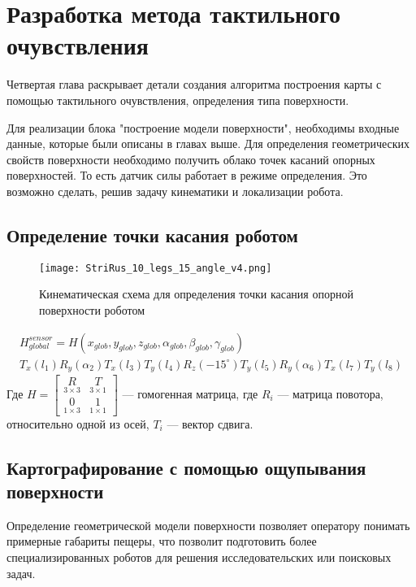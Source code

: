 \chapter{Разработка метода тактильного очувствления}\label{ch:ch4}


Четвертая глава раскрывает детали создания алгоритма построения карты с помощью тактильного очувствления, определения типа поверхности.

Для реализации блока "построение модели поверхности", необходимы входные данные, которые были  описаны в главах выше. Для определения геометрических свойств поверхности необходимо получить облако точек касаний опорных поверхностей. То есть датчик силы работает в режиме определения. Это возможно сделать, решив задачу кинематики и локализации робота.

\section{Определение точки касания роботом}
\begin{figure}[H]
    \centering\texttt{[image: StriRus\_10\_legs\_15\_angle\_v4.png]}
    \caption{Кинематическая схема для определения точки касания опорной поверхности роботом}
    \label{fig:StriRus_10_legs_15_angle_v4.png}
\end{figure}
\begin{multline}
        H_{global}^{sensor} = H(x_{glob},y_{glob},z_{glob},\alpha_{glob},\beta_{glob},\gamma_{glob})\\ T_x(l_1)R_y(\alpha_2)T_x(l_3)T_y(l_4)R_z(-15^{\circ})T_y(l_5)R_y(\alpha_6)T_x(l_7)T_y(l_8)
\end{multline}
Где $H = \begin{bmatrix}
        \underset{3 \times 3}{R} & \underset{3 \times 1}{T} \\
        \underset{1 \times 3}{0} & \underset{1 \times 1}{1}
    \end{bmatrix}$ --- гомогенная матрица, где $R_i$ --- матрица повотора, относительно одной из осей, $T_i$ --- вектор сдвига.

\section{Картографирование с помощью ощупывания поверхности}
Определение геометрической модели поверхности позволяет оператору понимать примерные габариты пещеры, что позволит подготовить более специализированных роботов для решения исследовательских или поисковых задач.

